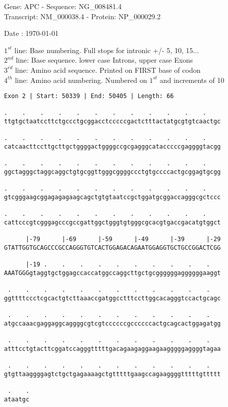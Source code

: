 \documentclass{article}
\begin{document}
\begin{center}
\begin{large}
Gene: APC - Sequence: NG\_008481.4\\
Transcript: NM\_000038.4 - Protein: NP\_000029.2
 
 Date : \today
\end{large}
\end{center}
$1^{st}$ line: Base numbering. Full stops for intronic +/- 5, 10, 15...\\
$2^{nd}$ line: Base sequence. lower case Introns, upper case Exons\\
$3^{rd}$ line: Amino acid sequence. Printed on FIRST base of codon\\
$4^{th}$ line: Amino acid numbering. Numbered on $1^{st}$ and increments of 10\\
\begin{Verbatim}
Exon 2 | Start: 50339 | End: 50405 | Length: 66
 
.    .    .    .    .    .    .    .    .    .    .    .    
ttgtgctaatccttctgccctgcggacctcccccgactctttactatgcgtgtcaactgc
  
.    .    .    .    .    .    .    .    .    .    .    .    
catcaacttccttgcttgctggggactggggccgcgagggcatacccccgaggggtacgg
  
.    .    .    .    .    .    .    .    .    .    .    .    
ggctagggctaggcaggctgtgcggttgggcggggccctgtgccccactgcggagtgcgg
  
.    .    .    .    .    .    .    .    .    .    .    .    
gtcgggaagcggagagagaagcagctgtgtaatccgctggatgcggaccagggcgctccc
  
.    .    .    .    .    .    .    .    .    .    .    .    
cattcccgtcgggagcccgccgattggctgggtgtgggcgcacgtgaccgacatgtggct
  
      |-79      |-69      |-59      |-49      |-39      |-29
GTATTGGTGCAGCCCGCCAGGGTGTCACTGGAGACAGAATGGAGGTGCTGCCGGACTCGG
  
      |-19 .    .    .    .    .    .    .    .    .    .   
AAATGGGgtaggtgctggagccaccatggccaggcttgctgcggggggaggggggaaggt
  
 .    .    .    .    .    .    .    .    .    .    .    .   
ggttttccctcgcactgtcttaaaccgatggcctttccttggcacagggtccactgcagc
  
 .    .    .    .    .    .    .    .    .    .    .    .   
atgccaaacgaggaggcaggggcgtcgtccccccgccccccactgcagcactggagatgg
  
 .    .    .    .    .    .    .    .    .    .    .    .   
atttcctgtacttcggatccagggtttttgacagaagaggaagaagggggaggggtagaa
  
 .    .    .    .    .    .    .    .    .    .    .    .   
gtgttaaggggagtctgctgagaaaagctgtttttgaagccagaaggggtttttgttttt
  
 .    .
ataatgc
\end{Verbatim}
\end{document}

